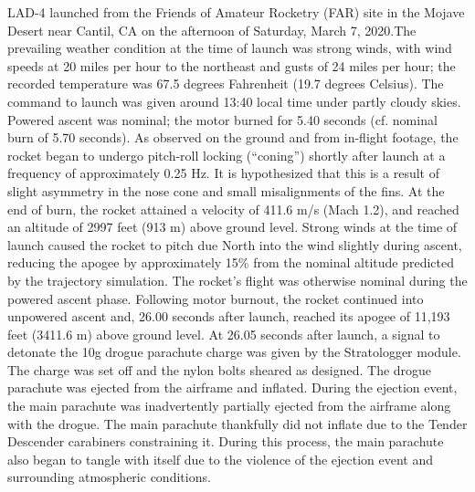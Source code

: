 LAD-4 launched from the Friends of Amateur Rocketry (FAR) site in the Mojave Desert near Cantil, CA on the afternoon of Saturday, March 7, 2020.The prevailing weather condition at the time of launch was strong winds, with wind speeds at 20 miles per hour to the northeast and gusts of 24 miles per hour; the recorded temperature was 67.5 degrees Fahrenheit (19.7 degrees Celsius). 
\newline\newline
The command to launch was given around 13:40 local time under partly cloudy skies. Powered ascent was nominal; the motor burned for 5.40 seconds (cf. nominal burn of 5.70 seconds). As observed on the ground and from in-flight footage, the rocket began to undergo pitch-roll locking (“coning”) shortly after launch at a frequency of approximately 0.25 Hz.  It is hypothesized that this is a result of slight asymmetry in the nose cone and small misalignments of the fins. At the end of burn, the rocket attained a velocity of 411.6 m/s (Mach 1.2), and reached an altitude of 2997 feet (913 m) above ground level. Strong winds at the time of launch caused the rocket to pitch due North into the wind slightly during ascent, reducing the apogee by approximately 15\% from the nominal altitude predicted by the trajectory simulation. The rocket’s flight was otherwise nominal during the powered ascent phase. Following motor burnout, the rocket continued into unpowered ascent and, 26.00 seconds after launch, reached its apogee of 11,193 feet (3411.6 m) above ground level. 
\newline\newline
At 26.05 seconds after launch, a signal to detonate the 10g drogue parachute charge was given by the Stratologger module. The charge was set off and the nylon bolts sheared as designed. The drogue parachute was ejected from the airframe and inflated. During the ejection event, the main parachute was inadvertently partially ejected from the airframe along with the drogue. The main parachute thankfully did not inflate due to the Tender Descender carabiners constraining it. During this process, the main parachute also began to tangle with itself due to the violence of the ejection event and surrounding atmospheric conditions.
\newline\newline

